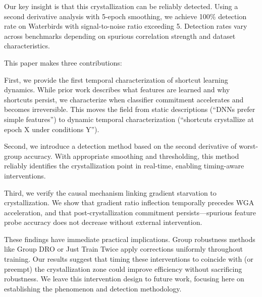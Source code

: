Our key insight is that this crystallization can be reliably detected. Using a second derivative analysis with 5-epoch smoothing, we achieve 100\% detection rate on Waterbirds with signal-to-noise ratio exceeding 5. Detection rates vary across benchmarks depending on spurious correlation strength and dataset characteristics.

This paper makes three contributions:

First, we provide the first temporal characterization of shortcut learning dynamics. While prior work describes what features are learned and why shortcuts persist, we characterize when classifier commitment accelerates and becomes irreversible. This moves the field from static descriptions (``DNNs prefer simple features'') to dynamic temporal characterization (``shortcuts crystallize at epoch X under conditions Y'').

Second, we introduce a detection method based on the second derivative of worst-group accuracy. With appropriate smoothing and thresholding, this method reliably identifies the crystallization point in real-time, enabling timing-aware interventions.

Third, we verify the causal mechanism linking gradient starvation to crystallization. We show that gradient ratio inflection temporally precedes WGA acceleration, and that post-crystallization commitment persists---spurious feature probe accuracy does not decrease without external intervention.

These findings have immediate practical implications. Group robustness methods like Group DRO or Just Train Twice apply corrections uniformly throughout training. Our results suggest that timing these interventions to coincide with (or preempt) the crystallization zone could improve efficiency without sacrificing robustness. We leave this intervention design to future work, focusing here on establishing the phenomenon and detection methodology.
